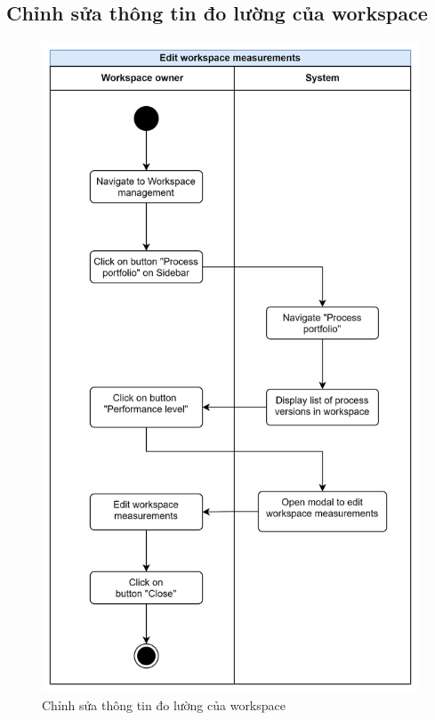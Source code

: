 \subsection{Chỉnh sửa thông tin đo lường của workspace}
\begin{figure}[H]
    \centering
    \includegraphics[width=0.8\linewidth]{Content/Phân tích và thiết kế hệ thống/documents/Sơ đồ hoạt động/images/editWorkspaceMeasurements.png}
    \vspace{0.5cm}
    \caption{Chỉnh sửa thông tin đo lường của workspace}
    \label{fig:Chỉnh sửa thông tin đo lường của workspace}
\end{figure}